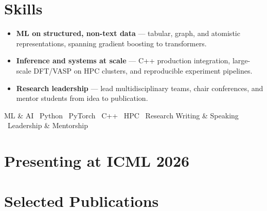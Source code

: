 \documentclass[11pt,a4paper]{article}
\begin{document}
\newpage

\section{Skills}
\begin{itemize}
  \item \textbf{ML on structured, non-text data} --- tabular, graph, and atomistic representations, spanning gradient boosting to transformers.
  \item \textbf{Inference and systems at scale} --- C++ production integration, large-scale DFT/VASP on HPC clusters, and reproducible experiment pipelines.
  \item \textbf{Research leadership} --- lead multidisciplinary teams, chair conferences, and mentor students from idea to publication.
\end{itemize}
{\small\centering ML \& AI \textbullet\ Python \textbullet\ PyTorch \textbullet\ C++ \textbullet\ HPC \textbullet\ Research Writing \& Speaking \textbullet\ Leadership \& Mentorship\par}

\nocite{*}
\section{Presenting at ICML 2026}
\printbibliography[filter=cvicml,heading=none,resetnumbers=true]

\section{Selected Publications}
\printbibliography[filter=cvselected,heading=none,resetnumbers=true]
\end{document}
